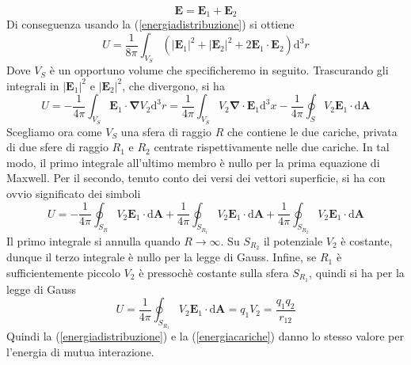 \documentclass[a4paper,11pt]{book}
\newcommand{\dif}{\mathrm{d}}
\let\oldnabla\nabla
\renewcommand{\nabla}{\vec{\oldnabla}}
\renewcommand{\vec}[1]{\mathbf{#1}}
\theoremstyle{theorem}
\theoremstyle{definition}
\begin{document}
\[
	\vec{E}=\vec{E}_1+\vec{E}_2
\]
Di conseguenza usando la (\ref{energiadistribuzione}) si ottiene
\[
	U=\frac{1}{8\pi}\int_{V_S}\left(|\vec{E}_1|^2+|\vec{E}_2|^2+2\vec{E}_1\cdot\vec{E}_2\right)\dif^3r
\]
Dove $V_S$ è un opportuno volume che specificheremo in seguito. Trascurando gli integrali in $|\vec{E}_1|^2$ e $|\vec{E}_2|^2$, che divergono, si ha
\[
	U=-\frac{1}{4\pi}\int_{V_S}\vec{E}_1\cdot\nabla V_2\dif^3r=\frac{1}{4\pi}\int_{V_S} V_2\nabla\cdot\vec{E}_1\dif^3x-\frac{1}{4\pi}\oint_SV_2\vec{E}_1\cdot\dif\vec{A}
\]
Scegliamo ora come $V_S$ una sfera di raggio $R$ che contiene le due cariche, privata di due sfere di raggio $R_1$ e $R_2$ centrate rispettivamente nelle due cariche. In tal modo, il primo integrale all'ultimo membro è nullo per la prima equazione di Maxwell. Per il secondo, tenuto conto dei versi dei vettori superficie, si ha con ovvio significato dei simboli
\[
	U=-\frac{1}{4\pi}\oint_{S_R}V_2\vec{E}_1\cdot\dif\vec{A}+\frac{1}{4\pi}\oint_{S_{R_1}}V_2\vec{E}_1\cdot\dif\vec{A}+\frac{1}{4\pi}\oint_{S_{R_2}}V_2\vec{E}_1\cdot\dif\vec{A}
\]
Il primo integrale si annulla quando $R\to\infty$. Su $S_{R_2}$ il potenziale $V_2$ è costante, dunque il terzo integrale è nullo per la legge di Gauss. Infine, se $R_1$ è sufficientemente piccolo $V_2$ è pressochè costante sulla sfera $S_{R_1}$, quindi si ha per la legge di Gauss
\[
	U=\frac{1}{4\pi}\oint_{S_{R_1}}V_2\vec{E}_1\cdot\dif\vec{A}=q_1V_2=\frac{q_1q_2}{r_{12}}
\]
Quindi la (\ref{energiadistribuzione}) e la (\ref{energiacariche}) danno lo stesso valore per l'energia di mutua interazione.
\end{document}
